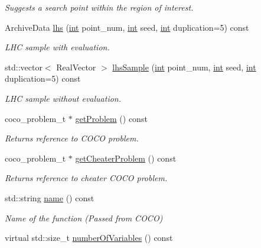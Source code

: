 \begin{DoxyCompactItemize}
\begin{DoxyCompactList}\small\item\em Suggests a search point within the region of interest. \end{DoxyCompactList}\item 
Archive\+Data \hyperlink{classCOCOfunc_a58a3396eaf1270cbafa023237e44266d}{lhs} (\hyperlink{classint}{int} point\+\_\+num, \hyperlink{classint}{int} seed, \hyperlink{classint}{int} duplication=5) const 
\begin{DoxyCompactList}\small\item\em L\+HC sample with evaluation. \end{DoxyCompactList}\item 
std\+::vector$<$ Real\+Vector $>$ \hyperlink{classCOCOfunc_ab45f933b1b59a3d0be4ce9fa83bc307e}{lhs\+Sample} (\hyperlink{classint}{int} point\+\_\+num, \hyperlink{classint}{int} seed, \hyperlink{classint}{int} duplication=5) const 
\begin{DoxyCompactList}\small\item\em L\+HC sample without evaluation. \end{DoxyCompactList}\item 
coco\+\_\+problem\+\_\+t $\ast$ \hyperlink{classCOCOfunc_a8af39fc2cc018f4ff0343c613d8132c3}{get\+Problem} () const \hypertarget{classCOCOfunc_a8af39fc2cc018f4ff0343c613d8132c3}{}\label{classCOCOfunc_a8af39fc2cc018f4ff0343c613d8132c3}

\begin{DoxyCompactList}\small\item\em Returns reference to C\+O\+CO problem. \end{DoxyCompactList}\item 
coco\+\_\+problem\+\_\+t $\ast$ \hyperlink{classCOCOfunc_aaed270701e406fe2c3bc8e86ac69d3b3}{get\+Cheater\+Problem} () const \hypertarget{classCOCOfunc_aaed270701e406fe2c3bc8e86ac69d3b3}{}\label{classCOCOfunc_aaed270701e406fe2c3bc8e86ac69d3b3}

\begin{DoxyCompactList}\small\item\em Returns reference to cheater C\+O\+CO problem. \end{DoxyCompactList}\item 
std\+::string \hyperlink{classCOCOfunc_ac62752306f9fd69cc0b50b38673ee16f}{name} () const \hypertarget{classCOCOfunc_ac62752306f9fd69cc0b50b38673ee16f}{}\label{classCOCOfunc_ac62752306f9fd69cc0b50b38673ee16f}

\begin{DoxyCompactList}\small\item\em Name of the function (Passed from C\+O\+CO) \end{DoxyCompactList}\item 
virtual std\+::size\+\_\+t \hyperlink{classCOCOfunc_a8690a176427c8d17fe12b183dfa205fd}{number\+Of\+Variables} () const \hypertarget{classCOCOfunc_a8690a176427c8d17fe12b183dfa205fd}{}\label{classCOCOfunc_a8690a176427c8d17fe12b183dfa205fd}


\end{DoxyCompactItemize}
